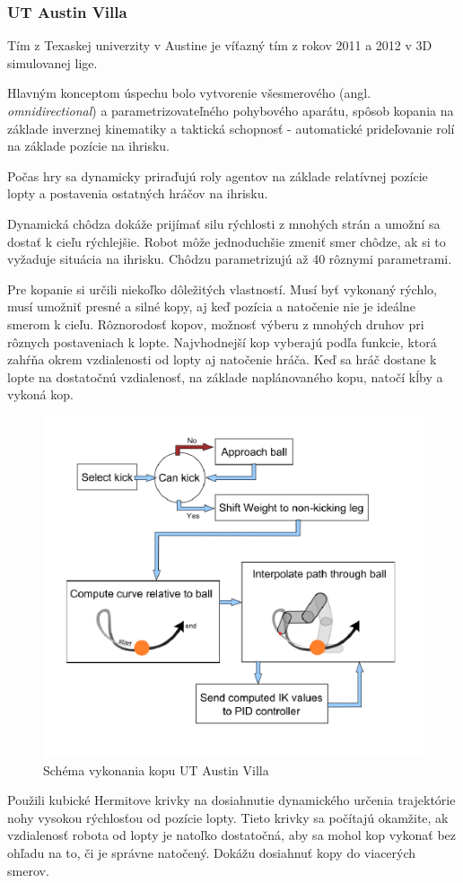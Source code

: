 \subsubsection{UT Austin Villa}
	\label{austin_villa}
Tím z Texaskej univerzity v Austine \cite{villa2013, villa_team, villa2012} je víťazný tím z rokov 2011 a 2012 v 3D simulovanej lige.

Hlavným konceptom úspechu bolo vytvorenie všesmerového (angl. \textit{omnidirectional}) a parametrizovateľného pohybového aparátu, spôsob kopania na základe inverznej kinematiky a taktická schopnosť - automatické prideľovanie rolí na základe pozície na ihrisku. 

Počas hry sa dynamicky priraďujú roly agentov na základe relatívnej pozície lopty a postavenia ostatných hráčov na ihrisku.

Dynamická chôdza dokáže prijímať silu rýchlosti z mnohých strán a umožní sa dostať k cieľu rýchlejšie. Robot môže jednoduchšie zmeniť smer chôdze, ak si to vyžaduje situácia na ihrisku. Chôdzu parametrizujú až 40 rôznymi parametrami. 

Pre kopanie si určili niekoľko dôležitých vlastností. Musí byť vykonaný rýchlo, musí umožniť presné a silné kopy, aj keď pozícia a natočenie nie je ideálne smerom k cieľu. Rôznorodosť kopov, možnosť výberu z mnohých druhov pri rôznych postaveniach k lopte. Najvhodnejší kop vyberajú podľa funkcie, ktorá zahŕňa okrem vzdialenosti od lopty aj natočenie hráča. Keď sa hráč dostane k lopte na dostatočnú vzdialenosť, na základe naplánovaného kopu, natočí kĺby a vykoná kop.

\begin{figure}[H]
	\center
	\includegraphics[scale=1]{./data/kick_arch_austin_villa}
	\caption{Schéma vykonania kopu UT Austin Villa \cite{villa2012}}
	\label{pic_kick_arch_austin_villa}
\end{figure}

Použili kubické Hermitove krivky na dosiahnutie dynamického určenia trajektórie nohy vysokou rýchlosťou od pozície lopty. Tieto krivky sa počítajú okamžite, ak vzdialenosť robota od lopty je natoľko dostatočná, aby sa mohol kop vykonať bez ohľadu na to, či je správne natočený. Dokážu dosiahnuť kopy do viacerých smerov. 
